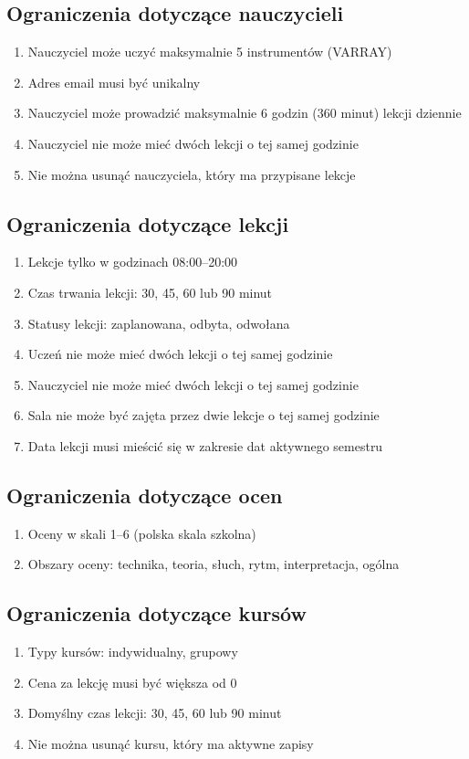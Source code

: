 \documentclass[12pt,a4paper]{article}
\begin{document}
\subsection{Ograniczenia dotyczące nauczycieli}
\begin{enumerate}[nosep]
    \item Nauczyciel może uczyć maksymalnie 5 instrumentów (VARRAY)
    \item Adres email musi być unikalny
    \item Nauczyciel może prowadzić maksymalnie 6 godzin (360 minut) lekcji dziennie
    \item Nauczyciel nie może mieć dwóch lekcji o tej samej godzinie
    \item Nie można usunąć nauczyciela, który ma przypisane lekcje
\end{enumerate}

\subsection{Ograniczenia dotyczące lekcji}
\begin{enumerate}[nosep]
    \item Lekcje tylko w godzinach 08:00--20:00
    \item Czas trwania lekcji: 30, 45, 60 lub 90 minut
    \item Statusy lekcji: zaplanowana, odbyta, odwołana
    \item Uczeń nie może mieć dwóch lekcji o tej samej godzinie
    \item Nauczyciel nie może mieć dwóch lekcji o tej samej godzinie
    \item Sala nie może być zajęta przez dwie lekcje o tej samej godzinie
    \item Data lekcji musi mieścić się w zakresie dat aktywnego semestru
\end{enumerate}

\subsection{Ograniczenia dotyczące ocen}
\begin{enumerate}[nosep]
    \item Oceny w skali 1--6 (polska skala szkolna)
    \item Obszary oceny: technika, teoria, słuch, rytm, interpretacja, ogólna
\end{enumerate}

\subsection{Ograniczenia dotyczące kursów}
\begin{enumerate}[nosep]
    \item Typy kursów: indywidualny, grupowy
    \item Cena za lekcję musi być większa od 0
    \item Domyślny czas lekcji: 30, 45, 60 lub 90 minut
    \item Nie można usunąć kursu, który ma aktywne zapisy
\end{enumerate}
\end{document}
